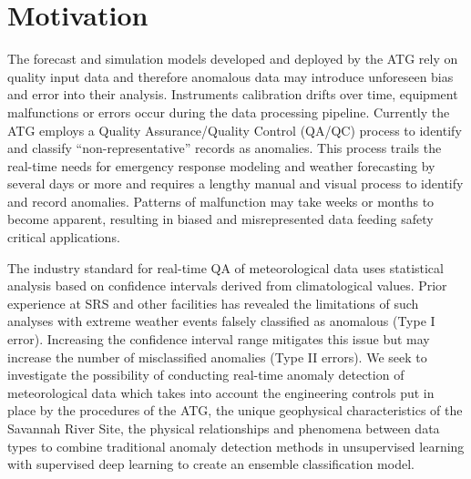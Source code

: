 \section{Motivation}
\label{sec:motivation}

The forecast and simulation models developed and deployed by the ATG rely on quality input data  and therefore anomalous data may introduce unforeseen bias and error into their analysis. Instruments calibration drifts over time, equipment malfunctions or errors occur during the data processing pipeline. Currently the ATG employs a Quality Assurance/Quality Control (QA/QC) process to identify and classify “non-representative” records as anomalies.  This process trails the real-time needs for emergency response modeling and weather forecasting by several days or more and requires a lengthy manual and visual process to identify and record anomalies.  Patterns of malfunction may take weeks or months to become apparent, resulting in biased and misrepresented data feeding safety critical applications.

The industry standard for real-time QA of meteorological data uses statistical analysis based on confidence intervals derived from climatological values. Prior experience at SRS and other facilities has revealed the limitations of such analyses with extreme weather events falsely classified as anomalous (Type I error). Increasing the confidence interval range mitigates this issue but may increase the number of misclassified anomalies (Type II errors). We seek to investigate the possibility of conducting real-time anomaly detection of meteorological data which takes into account the engineering controls put in place by the procedures of the ATG, the unique geophysical characteristics of the Savannah River Site, the physical relationships and phenomena between data types to combine traditional anomaly detection methods in unsupervised learning with supervised deep learning to create an ensemble classification model.
